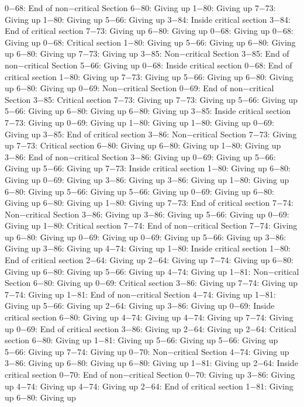 0−68: End of non−critical Section
6−80: Giving up
1−80: Giving up
7−73: Giving up
1−80: Giving up
5−66: Giving up
3−84: Inside critical section
3−84: End of critical section
7−73: Giving up
6−80: Giving up
0−68: Giving up
0−68: Giving up
0−68: Critical section
1−80: Giving up
5−66: Giving up
6−80: Giving up
6−80: Giving up
7−73: Giving up
3−85: Non−critical Section
3−85: End of non−critical Section
5−66: Giving up
0−68: Inside critical section
0−68: End of critical section
1−80: Giving up
7−73: Giving up
5−66: Giving up
6−80: Giving up
6−80: Giving up
0−69: Non−critical Section
0−69: End of non−critical Section
3−85: Critical section
7−73: Giving up
7−73: Giving up
5−66: Giving up
5−66: Giving up
6−80: Giving up
6−80: Giving up
3−85: Inside critical section
7−73: Giving up
0−69: Giving up
1−80: Giving up
1−80: Giving up
0−69: Giving up
3−85: End of critical section
3−86: Non−critical Section
7−73: Giving up
7−73: Critical section
6−80: Giving up
6−80: Giving up
1−80: Giving up
3−86: End of non−critical Section
3−86: Giving up
0−69: Giving up
5−66: Giving up
5−66: Giving up
7−73: Inside critical section
1−80: Giving up
6−80: Giving up
0−69: Giving up
3−86: Giving up
3−86: Giving up
1−80: Giving up
6−80: Giving up
5−66: Giving up
5−66: Giving up
0−69: Giving up
6−80: Giving up
6−80: Giving up
1−80: Giving up
7−73: End of critical section
7−74: Non−critical Section
3−86: Giving up
3−86: Giving up
5−66: Giving up
0−69: Giving up
1−80: Critical section
7−74: End of non−critical Section
7−74: Giving up
6−80: Giving up
0−69: Giving up
0−69: Giving up
5−66: Giving up
3−86: Giving up
3−86: Giving up
4−74: Giving up
1−80: Inside critical section
1−80: End of critical section
2−64: Giving up
2−64: Giving up
7−74: Giving up
6−80: Giving up
6−80: Giving up
5−66: Giving up
4−74: Giving up
1−81: Non−critical Section
6−80: Giving up
0−69: Critical section
3−86: Giving up
7−74: Giving up
7−74: Giving up
1−81: End of non−critical Section
4−74: Giving up
1−81: Giving up
5−66: Giving up
2−64: Giving up
3−86: Giving up
0−69: Inside critical section
6−80: Giving up
4−74: Giving up
4−74: Giving up
7−74: Giving up
0−69: End of critical section
3−86: Giving up
2−64: Giving up
2−64: Critical section
6−80: Giving up
1−81: Giving up
5−66: Giving up
5−66: Giving up
5−66: Giving up
7−74: Giving up
0−70: Non−critical Section
4−74: Giving up
3−86: Giving up
6−80: Giving up
6−80: Giving up
1−81: Giving up
2−64: Inside critical section
0−70: End of non−critical Section
0−70: Giving up
3−86: Giving up
4−74: Giving up
4−74: Giving up
2−64: End of critical section
1−81: Giving up
6−80: Giving up

